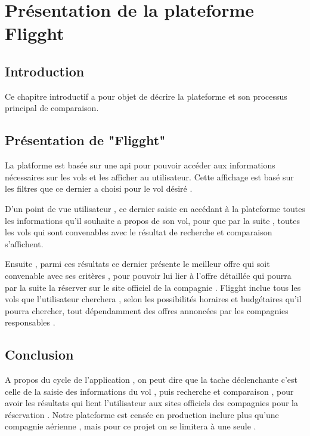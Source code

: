 \chapter{Présentation de la plateforme Fligght}

\begin{spacing}{1.2}

\section{Introduction}

\par Ce chapitre introductif a pour objet de décrire la plateforme et son processus principal de comparaison.


\section{Présentation de "Fligght"}
La platforme est basée sur une api pour pouvoir accéder aux informations nécessaires sur les vols et les afficher au utilisateur.
Cette affichage est basé sur les filtres que ce dernier a choisi pour le vol désiré .
\\ \par
D'un point de vue utilisateur , ce dernier saisie en accédant à la plateforme toutes les informations qu'il souhaite a propos de son vol, pour que par la suite , toutes les vols qui sont convenables avec le résultat de recherche et comparaison s'affichent. 
\\ \par Ensuite , parmi ces résultats ce dernier présente le meilleur offre qui soit convenable avec ses critères , pour pouvoir lui lier à l'offre détaillée qui pourra par la suite la réserver sur le site officiel de la compagnie . Fligght inclue tous les vols que l'utilisateur cherchera , selon les possibilités horaires et budgétaires qu'il pourra chercher, tout dépendamment des offres annoncées par les compagnies responsables .

\end{spacing}
\newpage \par
\section{Conclusion}A propos du cycle de l'application , on peut dire que la tache déclenchante c'est celle de la saisie des informations du vol , puis recherche et comparaison , pour avoir les résultats qui lient l'utilisateur aux sites officiels des compagnies pour la réservation . Notre plateforme est censée en production inclure plus qu'une compagnie aérienne , mais pour ce projet on se limitera à une seule .